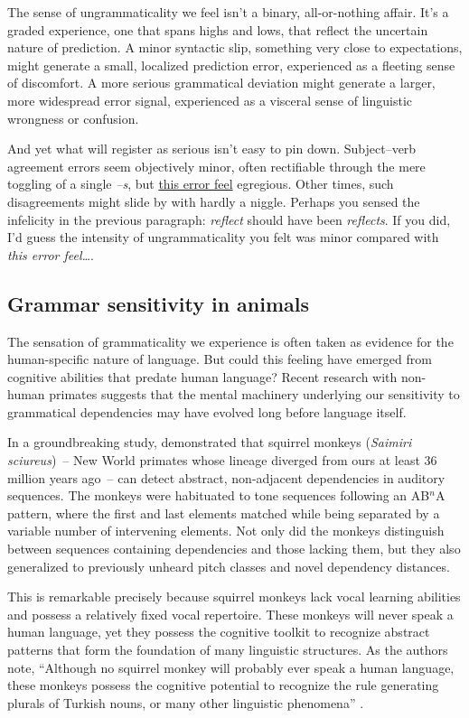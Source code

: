 The sense of ungrammaticality we feel isn't a binary, all-or-nothing affair. It's a graded experience, one that spans highs and lows, that reflect the uncertain nature of prediction. A minor syntactic slip, something very close to expectations, might generate a small, localized prediction error, experienced as a fleeting sense of discomfort. A more serious grammatical deviation might generate a larger, more widespread error signal, experienced as a visceral sense of linguistic wrongness or confusion.

And yet what will register as serious isn't easy to pin down. Subject--verb agreement errors seem objectively minor, often rectifiable through the mere toggling of a single \textit{--s}, but \uline{this error feel} egregious. Other times, such disagreements might slide by with hardly a niggle. Perhaps you sensed the infelicity in the previous paragraph: \textit{reflect} should have been \textit{reflects}. If you did, I'd guess the intensity of ungrammaticality you felt was minor compared with \textit{this error feel\dots}.

\subsection{Grammar sensitivity in animals}

The sensation of grammaticality we experience is often taken as evidence for the human-specific nature of language. But could this feeling have emerged from cognitive abilities that predate human language? Recent research with non-human primates suggests that the mental machinery underlying our sensitivity to grammatical dependencies may have evolved long before language itself.

In a groundbreaking study, \citet{Ravignani2013} demonstrated that squirrel monkeys (\textit{Saimiri sciureus})~-- New World primates whose lineage diverged from ours at least 36 million years ago~-- can detect abstract, non-adjacent dependencies in auditory sequences. The monkeys were habituated to tone sequences following an AB$^n$A pattern, where the first and last elements matched while being separated by a variable number of intervening elements. Not only did the monkeys distinguish between sequences containing dependencies and those lacking them, but they also generalized to previously unheard pitch classes and novel dependency distances.

This is remarkable precisely because squirrel monkeys lack vocal learning abilities and possess a relatively fixed vocal repertoire. These monkeys will never speak a human language, yet they possess the cognitive toolkit to recognize abstract patterns that form the foundation of many linguistic structures. As the authors note, ``Although no squirrel monkey will probably ever speak a human language, these monkeys possess the cognitive potential to recognize the rule generating plurals of Turkish nouns, or many other linguistic phenomena'' \citep[4]{Ravignani2013}.

